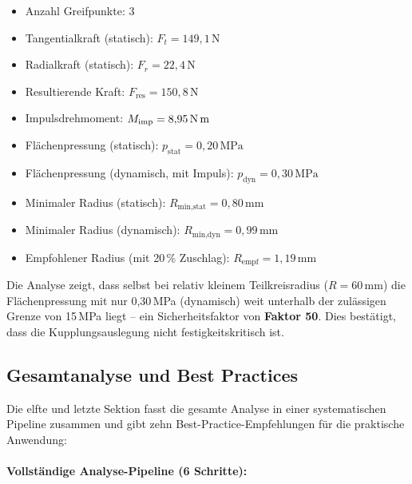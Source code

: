 ﻿\documentclass[a4paper,12pt]{article}
\begin{document}
\begin{itemize}
  \item Anzahl Greifpunkte: 3
  \item Tangentialkraft (statisch): $F_t = 149{,}1\,\text{N}$
  \item Radialkraft (statisch): $F_r = 22{,}4\,\text{N}$
  \item Resultierende Kraft: $F_\text{res} = 150{,}8\,\text{N}$
  \item Impulsdrehmoment: $M_\text{imp} = 8{,}95\,\text{N\,m}$
  \item Flächenpressung (statisch): $p_\text{stat} = 0{,}20\,\text{MPa}$
  \item Flächenpressung (dynamisch, mit Impuls): $p_\text{dyn} = 0{,}30\,\text{MPa}$
  \item Minimaler Radius (statisch): $R_\text{min,stat} = 0{,}80\,\text{mm}$
  \item Minimaler Radius (dynamisch): $R_\text{min,dyn} = 0{,}99\,\text{mm}$
  \item Empfohlener Radius (mit 20\,\% Zuschlag): $R_\text{empf} = 1{,}19\,\text{mm}$
\end{itemize}

Die Analyse zeigt, dass selbst bei relativ kleinem Teilkreisradius ($R = 60\,\text{mm}$)
die Flächenpressung mit nur 0{,}30\,MPa (dynamisch) weit unterhalb der
zulässigen Grenze von 15\,MPa liegt -- ein Sicherheitsfaktor von \textbf{Faktor 50}.
Dies bestätigt, dass die Kupplungsauslegung nicht festigkeitskritisch ist.

\subsection{Gesamtanalyse und Best Practices}

Die elfte und letzte Sektion fasst die gesamte Analyse in einer systematischen
Pipeline zusammen und gibt zehn Best-Practice-Empfehlungen für die praktische
Anwendung:

\paragraph{Vollständige Analyse-Pipeline (6 Schritte):}
\end{document}
